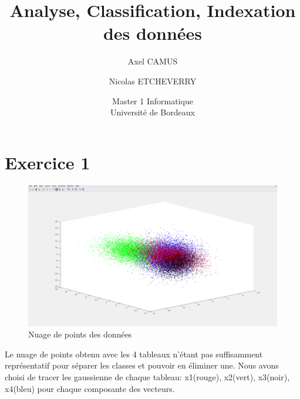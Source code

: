 \documentclass{article}
\begin{document}
\begin{titlepage}
\lstset{language=C}
\title{Analyse, Classification, Indexation des données}
\author{Axel CAMUS
\and
Nicolas ETCHEVERRY}
\date{Master 1 Informatique\\ Université de Bordeaux}
\maketitle
\end{titlepage}

\section{Exercice 1}

\begin{figure}[h]
\centerline{\includegraphics[scale=0.4]{donneePoint.png}}
\caption{Nuage de points des données}
\end{figure}

Le nuage de points obtenu avec les 4 tableaux n'étant pas suffisamment représentatif pour séparer les classes et pouvoir en éliminer une. Nous avons choisi de tracer les gaussienne de chaque tableau: x1(rouge), x2(vert), x3(noir), x4(bleu) pour chaque composante des vecteurs.
\end{document}

